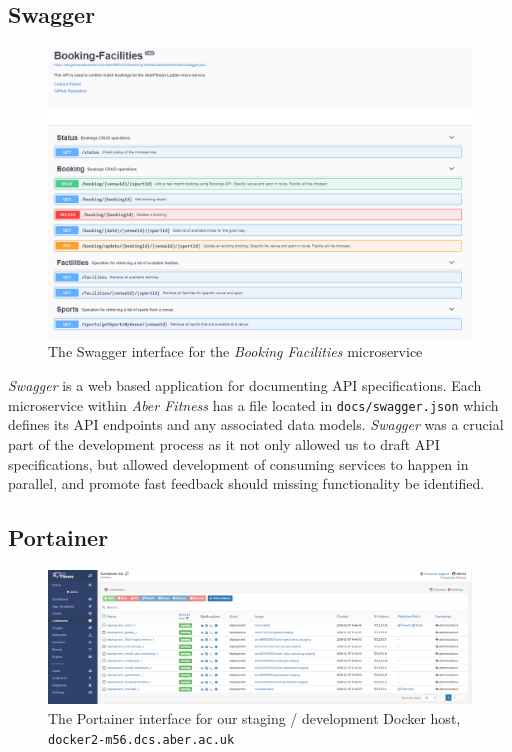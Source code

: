 \subsection{Swagger}
\begin{figure}[H]
    \centering
    \includegraphics[width=\textwidth]{Images/Swagger.png}
    \caption{The Swagger interface for the \textit{Booking Facilities} microservice}
    \label{fig:swagger_ui}
\end{figure}

\textit{Swagger} is a web based application for documenting API specifications. Each microservice within \textit{Aber Fitness} has a file located in \lstinline{docs/swagger.json} which defines its API endpoints and any associated data models. \textit{Swagger} was a crucial part of the development process as it not only allowed us to draft API specifications, but allowed development of consuming services to happen in parallel, and promote fast feedback should missing functionality be identified.

\subsection{Portainer}
\begin{figure}[H]
    \centering
    \includegraphics[width=\textwidth]{Images/Portainer.png}
    \caption{The Portainer interface for our staging / development Docker host, \lstinline{docker2-m56.dcs.aber.ac.uk}}
    \label{fig:portainer_ui}
\end{figure}


